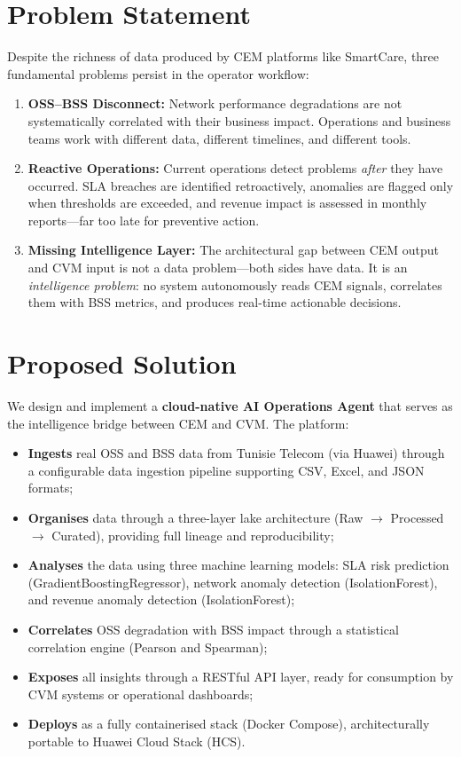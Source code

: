 \section{Problem Statement}

Despite the richness of data produced by CEM platforms like SmartCare, three fundamental problems persist in the operator workflow:

\begin{enumerate}[label=\textbf{P\arabic*.}]
  \item \textbf{OSS--BSS Disconnect:} Network performance degradations are not systematically correlated with their business impact. Operations and business teams work with different data, different timelines, and different tools.
  
  \item \textbf{Reactive Operations:} Current operations detect problems \emph{after} they have occurred. SLA breaches are identified retroactively, anomalies are flagged only when thresholds are exceeded, and revenue impact is assessed in monthly reports---far too late for preventive action.
  
  \item \textbf{Missing Intelligence Layer:} The architectural gap between CEM output and CVM input is not a data problem---both sides have data. It is an \emph{intelligence problem}: no system autonomously reads CEM signals, correlates them with BSS metrics, and produces real-time actionable decisions.
\end{enumerate}

\section{Proposed Solution}

We design and implement a \textbf{cloud-native AI Operations Agent} that serves as the intelligence bridge between CEM and CVM. The platform:

\begin{itemize}
  \item \textbf{Ingests} real OSS and BSS data from Tunisie Telecom (via Huawei) through a configurable data ingestion pipeline supporting CSV, Excel, and JSON formats;
  \item \textbf{Organises} data through a three-layer lake architecture (Raw $\to$ Processed $\to$ Curated), providing full lineage and reproducibility;
  \item \textbf{Analyses} the data using three machine learning models: SLA risk prediction (GradientBoostingRegressor), network anomaly detection (IsolationForest), and revenue anomaly detection (IsolationForest);
  \item \textbf{Correlates} OSS degradation with BSS impact through a statistical correlation engine (Pearson and Spearman);
  \item \textbf{Exposes} all insights through a RESTful API layer, ready for consumption by CVM systems or operational dashboards;
  \item \textbf{Deploys} as a fully containerised stack (Docker Compose), architecturally portable to Huawei Cloud Stack (HCS).
\end{itemize}


